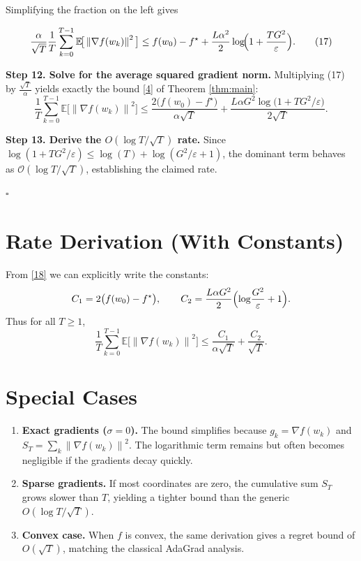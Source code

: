 \documentclass{article}
\newcommand{\E}{\mathbb{E}}
\newcommand{\norm}[1]{\left\lVert#1\right\rVert}
\begin{document}
Simplifying the fraction on the left gives

\[
\frac{\alpha}{\sqrt{T}}\frac{1}{T}\sum_{k=0}^{T-1}\E\!\big[\norm{\nabla f(w_k)}^{2}\big]
\le f(w_0)-f^{\star}
+\frac{L\alpha^{2}}{2}\log\!\Bigl(1+\frac{T G^{2}}{\varepsilon}\Bigr).
\tag{17}
\]

\noindent\textbf{Step 12. Solve for the average squared gradient norm.}
Multiplying (17) by $\frac{\sqrt{T}}{\alpha}$ yields exactly the bound \eqref{4} of Theorem \ref{thm:main}:
\[
\frac{1}{T}\sum_{k=0}^{T-1}\E\!\big[\norm{\nabla f(w_k)}^{2}\big]
\le
\frac{2\big(f(w_0)-f^{\star}\big)}{\alpha\sqrt{T}}
+\frac{L\alpha G^{2}\log\!\big(1+T G^{2}/\varepsilon\big)}{2\sqrt{T}}.
\tag{18}
\]

\noindent\textbf{Step 13. Derive the $O(\log T/\sqrt{T})$ rate.}  
Since $\log(1+TG^{2}/\varepsilon)\le \log(T)+\log(G^{2}/\varepsilon+1)$, the dominant term behaves as $\mathcal{O}(\log T/\sqrt{T})$, establishing the claimed rate.

\hfill $\square$

\section*{Rate Derivation (With Constants)}
From \eqref{18} we can explicitly write the constants:
\[
C_{1}=2\big(f(w_0)-f^{\star}\big),\qquad 
C_{2}= \frac{L\alpha G^{2}}{2}\Bigl(\log\!\frac{G^{2}}{\varepsilon}+1\Bigr).
\]
Thus for all $T\ge 1$,
\[
\frac{1}{T}\sum_{k=0}^{T-1}\E\!\big[\norm{\nabla f(w_k)}^{2}\big]
\le \frac{C_{1}}{\alpha\sqrt{T}}+\frac{C_{2}}{\sqrt{T}}.
\]

\section*{Special Cases}
\begin{enumerate}[leftmargin=*]
\item \textbf{Exact gradients ($\sigma=0$).} The bound simplifies because $g_k=\nabla f(w_k)$ and $S_T=\sum_{k}\norm{\nabla f(w_k)}^{2}$. The logarithmic term remains but often becomes negligible if the gradients decay quickly.
\item \textbf{Sparse gradients.} If most coordinates are zero, the cumulative sum $S_T$ grows slower than $T$, yielding a tighter bound than the generic $O(\log T/\sqrt{T})$.
\item \textbf{Convex case.} When $f$ is convex, the same derivation gives a regret bound of $O(\sqrt{T})$, matching the classical AdaGrad analysis.
\end{enumerate}
\end{document}
